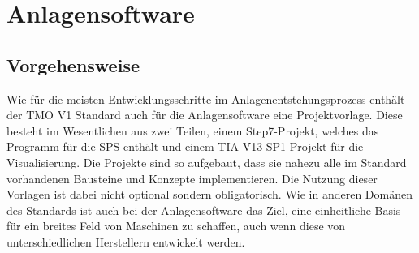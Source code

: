 

\chapter{Anlagensoftware}
\label{chap:software}

\section{Vorgehensweise}
\label{sec:software_procedure}

Wie für die meisten Entwicklungsschritte im Anlagenentstehungsprozess enthält der TMO V1 Standard auch für die Anlagensoftware eine Projektvorlage. Diese besteht im Wesentlichen aus zwei Teilen, einem Step7-Projekt, welches das Programm für die SPS enthält und einem TIA V13 SP1 Projekt für die Visualisierung. %
Die Projekte sind so aufgebaut, dass sie nahezu alle im Standard vorhandenen Bausteine und Konzepte implementieren. Die Nutzung dieser Vorlagen ist dabei nicht optional sondern obligatorisch. Wie in anderen Domänen des Standards ist auch bei der Anlagensoftware das Ziel, eine einheitliche Basis für ein breites Feld von Maschinen zu schaffen, auch wenn diese von unterschiedlichen Herstellern entwickelt werden.\par

